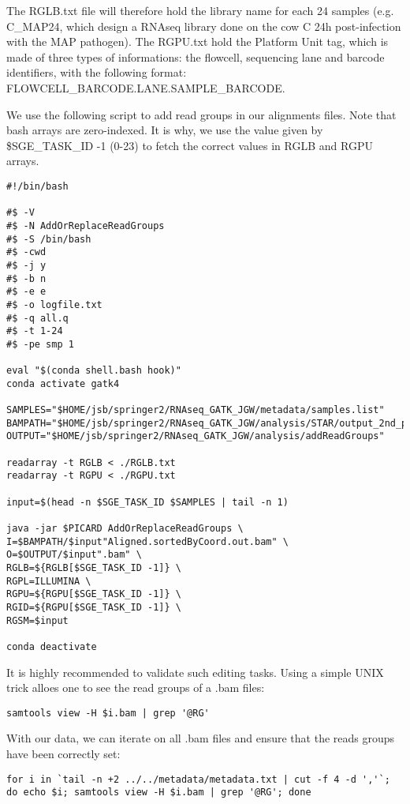The RGLB.txt file will therefore hold the library name for each 24 samples (e.g. C\_MAP24, which design a RNAseq library done on the cow C 24h post-infection with the MAP pathogen). The RGPU.txt hold the Platform Unit tag, which is made of three types of informations: the flowcell, sequencing lane and barcode identifiers, with the following format: {FLOWCELL\_BARCODE}.{LANE}.{SAMPLE\_BARCODE}. 


We use the following script to add read groups in our alignments files. Note that bash arrays are zero-indexed. It is why, we use the value given by \$SGE\_TASK\_ID -1 (0-23) to fetch the correct values in RGLB and RGPU arrays.

\begin{verbatim}
#!/bin/bash

#$ -V
#$ -N AddOrReplaceReadGroups
#$ -S /bin/bash
#$ -cwd
#$ -j y
#$ -b n
#$ -e e
#$ -o logfile.txt
#$ -q all.q
#$ -t 1-24
#$ -pe smp 1

eval "$(conda shell.bash hook)"
conda activate gatk4

SAMPLES="$HOME/jsb/springer2/RNAseq_GATK_JGW/metadata/samples.list"
BAMPATH="$HOME/jsb/springer2/RNAseq_GATK_JGW/analysis/STAR/output_2nd_pass"
OUTPUT="$HOME/jsb/springer2/RNAseq_GATK_JGW/analysis/addReadGroups"

readarray -t RGLB < ./RGLB.txt
readarray -t RGPU < ./RGPU.txt

input=$(head -n $SGE_TASK_ID $SAMPLES | tail -n 1)

java -jar $PICARD AddOrReplaceReadGroups \
I=$BAMPATH/$input"Aligned.sortedByCoord.out.bam" \
O=$OUTPUT/$input".bam" \
RGLB=${RGLB[$SGE_TASK_ID -1]} \
RGPL=ILLUMINA \
RGPU=${RGPU[$SGE_TASK_ID -1]} \
RGID=${RGPU[$SGE_TASK_ID -1]} \
RGSM=$input

conda deactivate
\end{verbatim}


It is highly recommended to validate such editing tasks. Using a simple UNIX trick alloes one to see the read groups of a .bam files:

\begin{verbatim}
samtools view -H $i.bam | grep '@RG'	
\end{verbatim}

With our data, we can iterate on all .bam files and ensure that the reads groups have been correctly set:

\begin{verbatim}
for i in `tail -n +2 ../../metadata/metadata.txt | cut -f 4 -d ','`; do echo $i; samtools view -H $i.bam | grep '@RG'; done
\end{verbatim}






